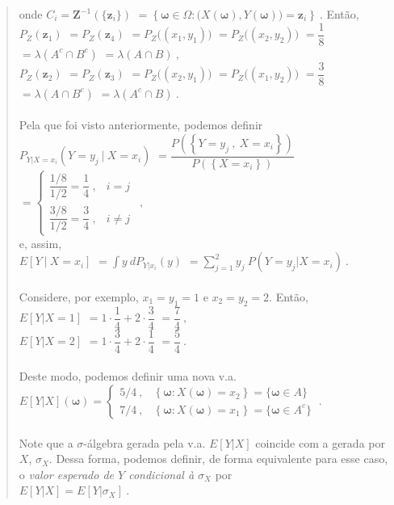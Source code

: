 \documentclass[
]{book}
\begin{document}
\begin{quote}
onde \(C_i=\boldsymbol Z^{-1}\left(\{\boldsymbol z_i\}\right)\) \(= \left\{\boldsymbol\omega\in\Omega:\big(X(\boldsymbol\omega),Y(\boldsymbol\omega)\big)=\boldsymbol z_i\right\}~.\) Então,\\
\(P_Z(\boldsymbol z_1)\) \(=P_Z(\boldsymbol z_4)\) \(=P_Z\big((x_1,y_1)\big)\) \(=P_Z\big((x_2,y_2)\big)\) \(=\dfrac{1}{8}\) \(=\lambda(A^c\cap B^c)\) \(=\lambda(A\cap B)~,\)\\
\(P_Z(\boldsymbol z_2)\) \(=P_Z(\boldsymbol z_3)\) \(=P_Z\big((x_2,y_1)\big)\) \(=P_Z\big((x_1,y_2)\big)\) \(=\dfrac{3}{8}\) \(=\lambda(A\cap B^c)\) \(=\lambda(A^c\cap B)~.\)\\
\(~\)\\
Pela que foi visto anteriormente, podemos definir\\
\(P_{Y|X=x_i}\left(Y=y_j~|~X=x_i\right)\)
\(=\dfrac{P\left(\left\{Y=y_j~,~X=x_i\right\}\right)}{P\left(\left\{X=x_i\right\}\right)}\)
\(=\left\{\begin{array}{ll}\dfrac{1/8}{1/2}=\dfrac{1}{4}~,&i=j\\\dfrac{3/8}{1/2}=\dfrac{3}{4}~,&i\neq j\end{array}\right.~~,\)\\
e, assim,\\
\(E\left[Y~|~X=x_i\right]\) \(=\displaystyle\int y~dP_{Y|x_i}(y)\)
\(=\displaystyle\sum_{j=1}^{2} y_j~P\left(Y=y_j|X=x_i\right)~.\)\\
\(~\)\\
Considere, por exemplo, \(x_1=y_1=1\) e \(x_2=y_2=2\). Então,\\
\(E[Y|X=1]\) \(=1\cdot\dfrac{1}{4}+2\cdot\dfrac{3}{4}\) \(=\dfrac{7}{4}~,\)\\
\(E[Y|X=2]\) \(=1\cdot\dfrac{3}{4}+2\cdot\dfrac{1}{4}\) \(=\dfrac{5}{4}~.\)\\
\(~\)\\
Deste modo, podemos definir uma nova v.a.\\
\(E[Y|X](\boldsymbol\omega)=\left\{\begin{array}{ll} 5/4~, & \left\{\boldsymbol\omega:X(\boldsymbol\omega)=x_2\right\}=\{\boldsymbol\omega \in A\}\\ 7/4~, & \left\{\boldsymbol\omega:X(\boldsymbol\omega)=x_1\right\}=\{\boldsymbol\omega \in A^c\} \end{array}\right.~.\)\\
\(~\)\\
Note que a \(\sigma\)-álgebra gerada pela v.a. \(E[Y|X]\) coincide com a gerada por \(X\), \(\sigma_X\). Dessa forma, podemos definir, de forma equivalente para esse caso, o \emph{valor esperado de \(Y\) condicional à \(\sigma_X\)} por\\
\(E[Y|X]=E[Y|\sigma_X]~.\)
\end{quote}

\(~\)

  
\end{document}
